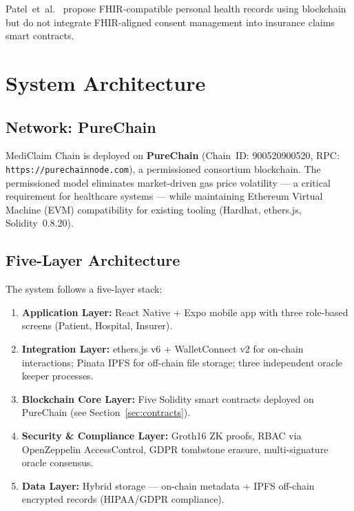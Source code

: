 \documentclass[journal]{IEEEtran}
\begin{document}
Patel~et~al.~\cite{lit:jpm_fhir} propose FHIR-compatible personal health
records using blockchain but do not integrate FHIR-aligned consent management
into insurance claims smart contracts.

\section{System Architecture}
\label{sec:arch}

\subsection{Network: PureChain}

MediClaim Chain is deployed on \textbf{PureChain} (Chain~ID: 900520900520,
RPC: \texttt{https://purechainnode.com}), a permissioned consortium blockchain.
The permissioned model eliminates market-driven gas price volatility — a
critical requirement for healthcare systems — while maintaining Ethereum
Virtual Machine (EVM) compatibility for existing tooling (Hardhat, ethers.js,
Solidity~0.8.20).

\subsection{Five-Layer Architecture}

The system follows a five-layer stack:
\begin{enumerate}
  \item \textbf{Application Layer:} React Native + Expo mobile app with three
        role-based screens (Patient, Hospital, Insurer).
  \item \textbf{Integration Layer:} ethers.js v6 + WalletConnect v2 for
        on-chain interactions; Pinata IPFS for off-chain file storage;
        three independent oracle keeper processes.
  \item \textbf{Blockchain Core Layer:} Five Solidity smart contracts deployed
        on PureChain (see Section~\ref{sec:contracts}).
  \item \textbf{Security \& Compliance Layer:} Groth16 ZK proofs, RBAC via
        OpenZeppelin AccessControl, GDPR tombstone erasure, multi-signature
        oracle consensus.
  \item \textbf{Data Layer:} Hybrid storage — on-chain metadata + IPFS
        off-chain encrypted records (HIPAA/GDPR compliance).
\end{enumerate}
\end{document}
